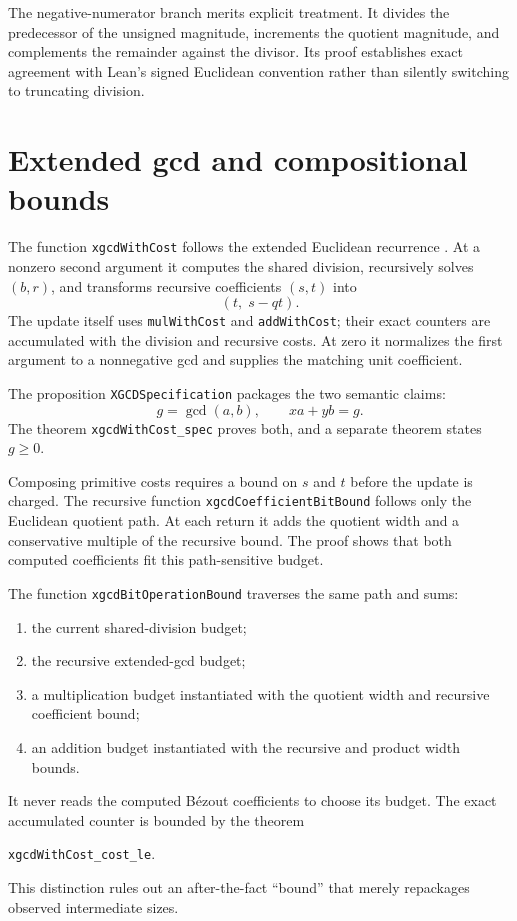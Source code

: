 \documentclass[11pt]{article}
\newcommand{\code}[1]{\texttt{#1}}
\begin{document}
The negative-numerator branch merits explicit treatment.  It divides the
predecessor of the unsigned magnitude, increments the quotient magnitude, and
complements the remainder against the divisor.  Its proof establishes exact
agreement with Lean's signed Euclidean convention rather than silently
switching to truncating division.

\section{Extended gcd and compositional bounds}

The function \code{xgcdWithCost} follows the extended Euclidean recurrence
\citep[Section 1.6]{brentZimmermann2010}.
At a nonzero second argument it computes the shared division, recursively
solves $(b,r)$, and transforms recursive coefficients $(s,t)$ into
\[
  (t,\;s-qt).
\]
The update itself uses \code{mulWithCost} and \code{addWithCost}; their exact
counters are accumulated with the division and recursive costs.  At zero it
normalizes the first argument to a nonnegative gcd and supplies the matching
unit coefficient.

The proposition \code{XGCDSpecification} packages the two semantic claims:
\[
 g=\gcd(a,b),\qquad xa+yb=g.
\]
The theorem \code{xgcdWithCost\_spec} proves both, and a separate theorem
states $g\ge 0$.

Composing primitive costs requires a bound on $s$ and $t$ before the update is
charged.  The recursive function \code{xgcdCoefficientBitBound} follows only
the Euclidean quotient path.  At each return it adds the quotient width and a
conservative multiple of the recursive bound.  The proof shows that both
computed coefficients fit this path-sensitive budget.

The function \code{xgcdBitOperationBound} traverses the same path and sums:
\begin{enumerate}
  \item the current shared-division budget;
  \item the recursive extended-gcd budget;
  \item a multiplication budget instantiated with the quotient width and
        recursive coefficient bound;
  \item an addition budget instantiated with the recursive and product width
        bounds.
\end{enumerate}
It never reads the computed B\'ezout coefficients to choose its budget.  The
exact accumulated counter is bounded by the theorem
\begin{center}
\code{xgcdWithCost\_cost\_le}.
\end{center}
This distinction rules out an after-the-fact ``bound'' that merely repackages
observed intermediate sizes.
\end{document}
